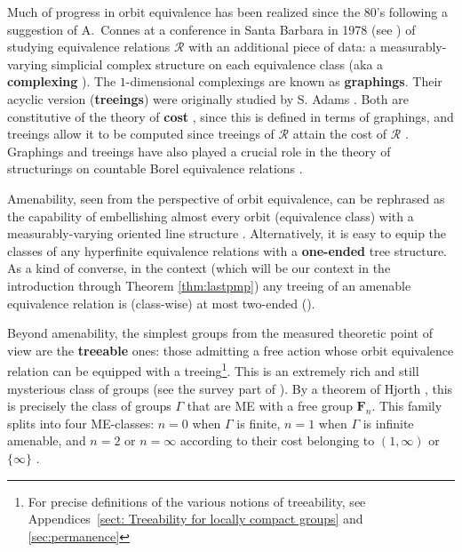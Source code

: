 \documentclass[11pt]{amsart}
\theoremstyle{definition}
\theoremstyle{plain}
\newcommand{\<}{\langle}
\renewcommand{\>}{\rangle}
\newcommand{\FF}{\mathbf{F}}
\newcommand{\define}[1]{\textbf{#1}}
\newcommand{\pmp}{\text{p.m.p.}}
\newcommand\RR{\mathscr{R}}
\begin{document}
Much of progress in orbit equivalence has been realized since the 80's following a suggestion of A.~Connes at a conference in Santa Barbara in 1978 (see  \cite{Ada90}) of studying equivalence relations $\RR$ with an additional piece of data: a measurably-varying simplicial complex structure on each equivalence class (aka a \define{complexing} \cite{Abert-Gab}). The $1$-dimensional complexings are known as \define{graphings}. Their acyclic version (\define{treeings}) were originally studied by S. Adams \cite{Ada90,Ada88}. Both are constitutive of the theory of \define{cost} \cite{Le95,Gab00a}, since this is defined in terms of graphings, and treeings allow it to be computed since treeings of $\RR$ attain the cost of $\RR$ \cite[Th\'eor\`eme 1]{Gab00a}. Graphings and treeings have also played a crucial role in the theory of structurings on countable Borel equivalence relations \cite{JKL02}.

Amenability, seen from the perspective of orbit equivalence, can be rephrased as the capability of embellishing almost every orbit (equivalence class) with a measurably-varying oriented line structure \cite{Dye59,OW80,CFW81}.
Alternatively, it is easy to equip the classes of any hyperfinite equivalence relations with a \define{one-ended} tree structure. As a kind of converse, in the {\pmp} context (which will be our context in the introduction through Theorem \ref{thm:lastpmp}) any treeing of an amenable equivalence relation is (class-wise) at most two-ended (\cite{Ada90}).

Beyond amenability, the simplest groups from the measured theoretic point of view are the \define{treeable} ones: those admitting a free {\pmp} action whose orbit equivalence relation can be equipped with a treeing\footnote{For precise definitions of the various notions of treeability, see Appendices~\ref{sect: Treeability for locally compact groups} and \ref{sec:permanence}}.
This is an extremely rich and still mysterious class of groups (see the survey part of \cite{Ga05}).
By a theorem of Hjorth \cite{Hjo-cost-att}, this is precisely the class of groups $\Gamma$ that are ME with a free group $\FF_n$. This family splits into four ME-classes: $n=0$ when $\Gamma$ is finite, $n=1$ when $\Gamma$ is infinite amenable, and $n=2$ or $n=\infty$ according to their cost belonging to $(1,\infty)$ or $\{\infty\}$ \cite{Gab00a}.
\end{document}
